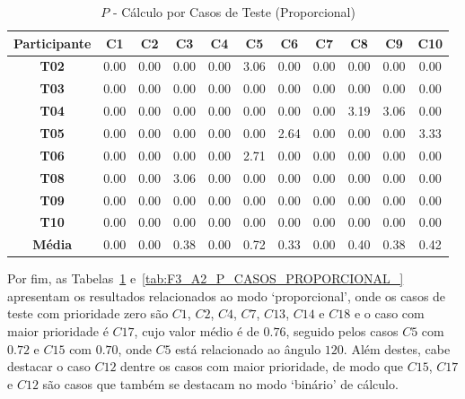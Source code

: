 \begin{table}[htbp]
	\centering
	\caption{$P$ - Cálculo por Casos de Teste (Proporcional)}
	\begin{tabular}{|c|c|c|c|c|c|c|c|c|c|c|}
		\hline
		\rowcolor[HTML]{D9D9D9} 
		\cellcolor[HTML]{D0CECE}\textbf{Participante} & \textbf{C1} & \textbf{C2} & \textbf{C3} & \textbf{C4} & \textbf{C5} & \textbf{C6} & \textbf{C7} & \textbf{C8} & \textbf{C9} & \textbf{C10} \\ \hline
		\textbf{T02} & 0.00 & 0.00 & 0.00 & 0.00 & 3.06 & 0.00 & 0.00 & 0.00 & 0.00 & 0.00 \\ \hline
		\rowcolor[HTML]{F2F2F2} 
		\textbf{T03} & 0.00 & 0.00 & 0.00 & 0.00 & 0.00 & 0.00 & 0.00 & 0.00 & 0.00 & 0.00 \\ \hline
		\textbf{T04} & 0.00 & 0.00 & 0.00 & 0.00 & 0.00 & 0.00 & 0.00 & 3.19 & 3.06 & 0.00 \\ \hline
		\rowcolor[HTML]{F2F2F2} 
		\textbf{T05} & 0.00 & 0.00 & 0.00 & 0.00 & 0.00 & 2.64 & 0.00 & 0.00 & 0.00 & 3.33 \\ \hline
		\textbf{T06} & 0.00 & 0.00 & 0.00 & 0.00 & 2.71 & 0.00 & 0.00 & 0.00 & 0.00 & 0.00 \\ \hline
		\rowcolor[HTML]{F2F2F2} 
		\textbf{T08} & 0.00 & 0.00 & 3.06 & 0.00 & 0.00 & 0.00 & 0.00 & 0.00 & 0.00 & 0.00 \\ \hline
		\textbf{T09} & 0.00 & 0.00 & 0.00 & 0.00 & 0.00 & 0.00 & 0.00 & 0.00 & 0.00 & 0.00 \\ \hline
		\rowcolor[HTML]{F2F2F2} 
		\textbf{T10} & 0.00 & 0.00 & 0.00 & 0.00 & 0.00 & 0.00 & 0.00 & 0.00 & 0.00 & 0.00 \\ \hline
		\rowcolor[HTML]{D0CECE} 
		\textbf{Média} & 0.00 & 0.00 & 0.38 & 0.00 & 0.72 & 0.33 & 0.00 & 0.40 & 0.38 & 0.42 \\ \hline
	\end{tabular}
	\label{tab:F3_A2_P_CASOS_PROPORCIONAL}
\end{table}

Por fim, as Tabelas~\ref{tab:F3_A2_P_CASOS_PROPORCIONAL} e~\ref{tab:F3_A2_P_CASOS_PROPORCIONAL_} apresentam os resultados relacionados ao modo `proporcional', onde os casos de teste com prioridade zero são $C1$, $C2$, $C4$, $C7$, $C13$, $C14$ e $C18$ e o caso com maior prioridade é $C17$, cujo valor médio é de $0.76$, seguido pelos casos $C5$ com $0.72$ e $C15$ com $0.70$, onde $C5$ está relacionado ao ângulo $120$. Além destes, cabe destacar o caso $C12$ dentre os casos com maior prioridade, de modo que $C15$, $C17$ e $C12$ são casos que também se destacam no modo `binário' de cálculo.

